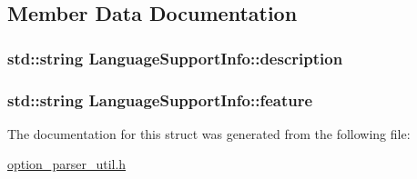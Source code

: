 \subsection{Member Data Documentation}
\hypertarget{structLanguageSupportInfo_a08a8ea5f69a611697c54e306c4cea4ad}{
\subsubsection[{description}]{\setlength{\rightskip}{0pt plus 5cm}std\-::string Language\-Support\-Info\-::description}}\label{structLanguageSupportInfo_a08a8ea5f69a611697c54e306c4cea4ad}
\hypertarget{structLanguageSupportInfo_a493690a9f05c9850192f1fd97679ec49}{
\subsubsection[{feature}]{\setlength{\rightskip}{0pt plus 5cm}std\-::string Language\-Support\-Info\-::feature}}\label{structLanguageSupportInfo_a493690a9f05c9850192f1fd97679ec49}


The documentation for this struct was generated from the following file\-:\begin{DoxyCompactItemize}
\item 
\hyperlink{option__parser__util_8h}{option\-\_\-parser\-\_\-util.\-h}\end{DoxyCompactItemize}
